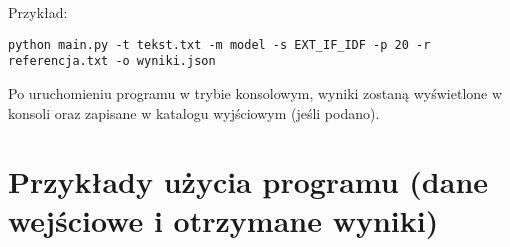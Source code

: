 \documentclass{article}
\begin{document}
Przykład:
\begin{verbatim}
python main.py -t tekst.txt -m model -s EXT_IF_IDF -p 20 -r referencja.txt -o wyniki.json
\end{verbatim}

Po uruchomieniu programu w trybie konsolowym, wyniki zostaną wyświetlone w konsoli oraz zapisane w katalogu wyjściowym (jeśli podano).

\section{Przykłady użycia programu (dane wejściowe i otrzymane wyniki)}



\end{document}
